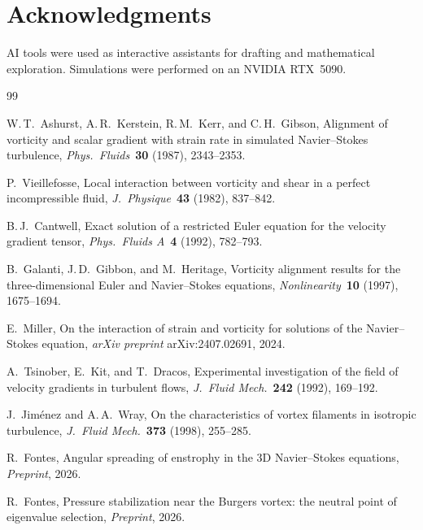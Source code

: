 \documentclass[11pt,a4paper]{article}
\theoremstyle{plain}
\theoremstyle{definition}
\theoremstyle{remark}
\begin{document}
\section*{Acknowledgments}

AI tools were used as interactive assistants for
drafting and mathematical exploration.
Simulations were performed on an NVIDIA RTX~5090.

\begin{thebibliography}{99}

W.\,T.~Ashurst, A.\,R.~Kerstein, R.\,M.~Kerr,
and C.\,H.~Gibson,
Alignment of vorticity and scalar gradient with strain
rate in simulated Navier--Stokes turbulence,
\emph{Phys.\ Fluids}~\textbf{30} (1987), 2343--2353.

P.~Vieillefosse,
Local interaction between vorticity and shear in a
perfect incompressible fluid,
\emph{J.\ Physique}~\textbf{43} (1982), 837--842.

B.\,J.~Cantwell,
Exact solution of a restricted Euler equation for the
velocity gradient tensor,
\emph{Phys.\ Fluids A}~\textbf{4} (1992), 782--793.

B.~Galanti, J.\,D.~Gibbon, and M.~Heritage,
Vorticity alignment results for the three-dimensional
Euler and Navier--Stokes equations,
\emph{Nonlinearity}~\textbf{10} (1997), 1675--1694.

E.~Miller,
On the interaction of strain and vorticity for
solutions of the Navier--Stokes equation,
\emph{arXiv preprint} arXiv:2407.02691, 2024.

A.~Tsinober, E.~Kit, and T.~Dracos,
Experimental investigation of the field of velocity
gradients in turbulent flows,
\emph{J.\ Fluid Mech.}~\textbf{242} (1992), 169--192.

J.~Jim\'enez and A.\,A.~Wray,
On the characteristics of vortex filaments in
isotropic turbulence,
\emph{J.\ Fluid Mech.}~\textbf{373} (1998), 255--285.

R.~Fontes,
Angular spreading of enstrophy in the 3D Navier--Stokes
equations,
\emph{Preprint}, 2026.

R.~Fontes,
Pressure stabilization near the Burgers vortex:
the neutral point of eigenvalue selection,
\emph{Preprint}, 2026.

\end{thebibliography}
\end{document}
